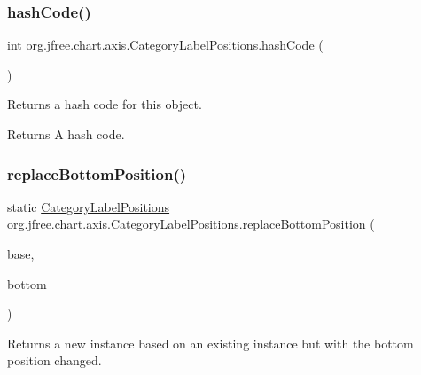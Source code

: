 \subsubsection{\texorpdfstring{hash\+Code()}{hashCode()}}
{\footnotesize\ttfamily int org.\+jfree.\+chart.\+axis.\+Category\+Label\+Positions.\+hash\+Code (\begin{DoxyParamCaption}{ }\end{DoxyParamCaption})}

Returns a hash code for this object.

\begin{DoxyReturn}{Returns}
A hash code. 
\end{DoxyReturn}
\mbox{\label{classorg_1_1jfree_1_1chart_1_1axis_1_1_category_label_positions_a80e897eac8ba6b82dca0d129ce4b9bce}} 
\subsubsection{\texorpdfstring{replace\+Bottom\+Position()}{replaceBottomPosition()}}
{\footnotesize\ttfamily static \mbox{\hyperlink{classorg_1_1jfree_1_1chart_1_1axis_1_1_category_label_positions}{Category\+Label\+Positions}} org.\+jfree.\+chart.\+axis.\+Category\+Label\+Positions.\+replace\+Bottom\+Position (\begin{DoxyParamCaption}\item[{\mbox{\hyperlink{classorg_1_1jfree_1_1chart_1_1axis_1_1_category_label_positions}{Category\+Label\+Positions}}}]{base,  }\item[{\mbox{\hyperlink{classorg_1_1jfree_1_1chart_1_1axis_1_1_category_label_position}{Category\+Label\+Position}}}]{bottom }\end{DoxyParamCaption})\hspace{0.3cm}{\ttfamily [static]}}

Returns a new instance based on an existing instance but with the bottom position changed.


